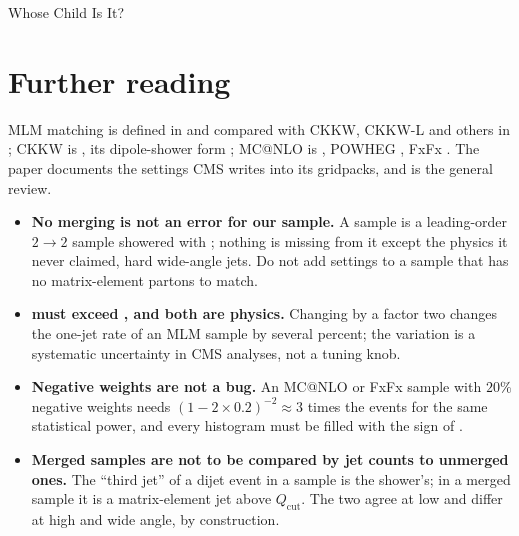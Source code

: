 \begin{ledger}{Whose Child Is It?}
\end{ledger}

\section{Further reading}
\label{sec:whose_child:further_reading}
MLM matching is defined in \cite{Mangano:2006rw} and compared with CKKW,
CKKW-L and others in \cite{Alwall:2007fs}; CKKW is \cite{Catani:2001cc},
its dipole-shower form \cite{Lonnblad:2001iq,Lonnblad:2011xx}; MC@NLO is
\cite{Frixione:2002ik}, POWHEG \cite{Nason:2004rx,Frixione:2007vw}, FxFx
\cite{Frederix:2012ps}. The \MG paper \cite{Alwall:2014hca} documents the
settings CMS writes into its gridpacks, and \cite{Buckley:2011ms} is the
general review.

\begin{pitfalls}
\begin{itemize}[nosep]
  \item \textbf{No merging is not an error for our sample.} A \PYTHIA
     sample is a leading-order $2\to2$ sample showered with
    ; nothing is missing from it except the physics
    it never claimed, hard wide-angle jets. Do not add 
    settings to a sample that has no matrix-element partons to match.
  \item \textbf{ must exceed , and both are physics.}
    Changing  by a factor two changes the one-jet rate of an MLM
    sample by several percent; the variation is a systematic uncertainty
    in CMS analyses, not a tuning knob.
  \item \textbf{Negative weights are not a bug.} An MC@NLO or FxFx sample
    with $20\%$ negative weights needs $(1-2\times0.2)^{-2}\approx3$ times
    the events for the same statistical power, and every histogram must be
    filled with the sign of .
  \item \textbf{Merged samples are not to be compared by jet counts to
    unmerged ones.} The ``third jet'' of a dijet event in a \PYTHIA
     sample is the shower's; in a merged sample it is a
    matrix-element jet above $Q_{\mathrm{cut}}$. The two agree at low \pt
    and differ at high \pt and wide angle, by construction.
\end{itemize}
\end{pitfalls}

